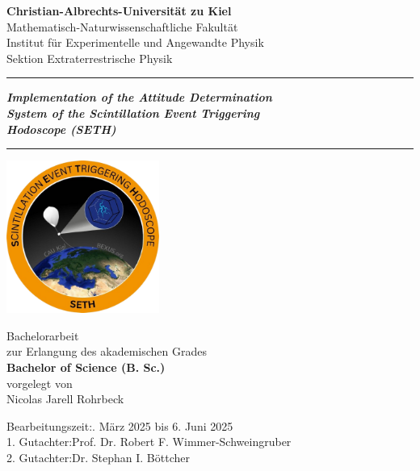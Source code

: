 \begin{titlepage}
\Huge\centering

\textbf{Christian-Albrechts-Universität zu Kiel}\\\LARGE\vspace{0.6cm}
Mathematisch-Naturwissenschaftliche Fakultät\\\Large\vspace{0.2cm}
Institut für Experimentelle und Angewandte Physik\\\vspace{0.1cm}
Sektion Extraterrestrische Physik\\\LARGE\vspace{2cm}

\hrule
\textbf{\textit{Implementation of the Attitude Determination\\ System of the Scintillation Event Triggering\\ Hodoscope (SETH)}}
\vspace{0.3cm}
\hrule
\vspace{1cm}

\includegraphics[height=5cm]{images/logo_SETH_v2_nobg.png}

\vspace{0.9cm}

\LARGE
Bachelorarbeit\\\vspace{0.2cm}\Large
zur Erlangung des akademischen Grades\\\vspace{0.2cm}\LARGE
\textbf{Bachelor of Science (B. Sc.)}\\
\large\vspace{1cm}
vorgelegt von\\\vspace{0.2cm}\Large
Nicolas Jarell Rohrbeck

\vspace{1.1cm}
\normalsize
\begin{flushleft}
Bearbeitungszeit:. März 2025 bis 6. Juni 2025\\
1. Gutachter:\quad Prof. Dr. Robert F. Wimmer-Schweingruber\\
2. Gutachter:\quad Dr. Stephan I. Böttcher\\
\end{flushleft}

\end{titlepage}
\restoregeometry